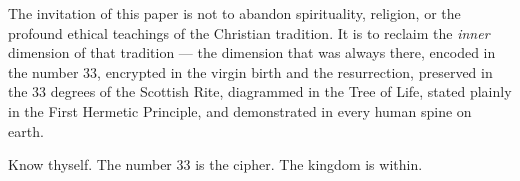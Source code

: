 \documentclass[12pt, a4paper]{article}
\begin{document}
The invitation of this paper is not to abandon spirituality, religion, or
the profound ethical teachings of the Christian tradition. It is to
reclaim the \emph{inner} dimension of that tradition — the dimension that was
always there, encoded in the number 33, encrypted in the virgin birth and the
resurrection, preserved in the 33 degrees of the Scottish Rite, diagrammed in
the Tree of Life, stated plainly in the First Hermetic Principle, and
demonstrated in every human spine on earth.

Know thyself. The number 33 is the cipher. The kingdom is within.

\newpage
\printbibliography[title={Bibliography}]
\end{document}
